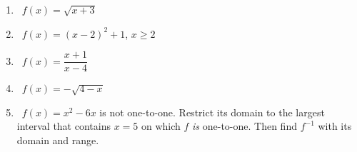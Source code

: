 \documentclass[11pt,letterpaper]{article}
\newif\ifkey
\newcommand{\badge}[2]{\tcbox[on line,colback=#1,colframe=#1,coltext=white,boxrule=0pt,arc=6pt,left=4pt,right=4pt,top=1pt,bottom=1pt,fontupper=\scriptsize\bfseries]{#2}}
\newcommand{\medium}{\badge{FangTeal}{MEDIUM}}
\newcommand{\hard}{\badge{FangRed}{HARD}}
\newcommand{\finv}{f^{-1}}
\newcommand{\work}[2][]{\ifkey\begin{sol}#2\end{sol}\else\vspace*{#1}\fi}
\newcommand{\np}[1][6cm]{\needspace{#1}}
\begin{document}
\begin{enumerate}[resume,leftmargin=*,label=\textbf{\arabic*.},itemsep=6pt]
\np\item \medium\ $f(x)=\sqrt{x+3}$
\work[3.2cm]{(a) Domain $[-3,\infty)$ (need $x+3\ge0$); range $[0,\infty)$. \\
(b) Swap: $x=\sqrt{y+3}$ \;$\to$\; $x^2=y+3$ \;$\to$\; $\finv(x)=x^2-3$, \; $x\ge0$. \\
(c) Domain of $\finv$ $=[0,\infty)$ (the range of $f$); range of $\finv$ $=[-3,\infty)$ (the domain of $f$). \\
Check: $f(1)=2$, \; $\finv(2)=4-3=1$ \checkmark}

\np\item \medium\ $f(x)=(x-2)^2+1$, \; $x\ge2$
\work[3.2cm]{(a) Domain $[2,\infty)$ (given); the vertex is $(2,1)$ and the graph goes up, so range $[1,\infty)$. \\
(b) Swap: $x=(y-2)^2+1$ \;$\to$\; $(y-2)^2=x-1$ \;$\to$\; $y-2=\sqrt{x-1}$ (take $+$, because $y\ge2$) \;$\to$\; $\finv(x)=2+\sqrt{x-1}$. \\
(c) Domain of $\finv$ $=[1,\infty)$; range $=[2,\infty)$. \quad Check: $f(4)=5$, \; $\finv(5)=2+2=4$ \checkmark}

\np\item \medium\ $f(x)=\dfrac{x+1}{x-4}$
\work[3.4cm]{(a) Domain $x\neq4$. Horizontal asymptote $y=1$ and $f(x)=1$ has no solution, so range $y\neq1$. \\
(b) Swap: $x=\dfrac{y+1}{y-4}$ \;$\to$\; $xy-4x=y+1$ \;$\to$\; $xy-y=4x+1$ \;$\to$\; $y(x-1)=4x+1$ \;$\to$\; $\finv(x)=\dfrac{4x+1}{x-1}$. \\
(c) Domain of $\finv$: $x\neq1$; range: $y\neq4$ — exactly the range and domain of $f$ swapped. \quad Check: $f(5)=6$, $\finv(6)=\frac{25}{5}=5$ \checkmark}

\np\item \hard\ $f(x)=-\sqrt{4-x}$
\work[3.4cm]{(a) Need $4-x\ge0$: domain $(-\infty,4]$. A square root is $\ge0$, so with the minus sign: range $(-\infty,0]$. \\
(b) Swap: $x=-\sqrt{4-y}$ \;$\to$\; square: $x^2=4-y$ \;$\to$\; $\finv(x)=4-x^2$, \; $x\le0$. \\
(c) Domain of $\finv$ $=(-\infty,0]$; range $=(-\infty,4]$. \quad Check: $f(0)=-2$, \; $\finv(-2)=4-4=0$ \checkmark \\
(Without ``$x\le0$'' the formula would be a whole parabola — wrong.)}

\np\item \hard\ $f(x)=x^2-6x$ is not one-to-one. Restrict its domain to the largest interval that contains $x=5$ on which $f$ \emph{is} one-to-one. Then find $\finv$ with its domain and range.
\work[3.8cm]{Complete the square: $f(x)=(x-3)^2-9$, vertex $(3,-9)$. Each side of $x=3$ is one-to-one; the side containing $5$ is $x\ge3$. \\
$f$: domain $[3,\infty)$, range $[-9,\infty)$. \\
Swap: $x=(y-3)^2-9$ \;$\to$\; $(y-3)^2=x+9$ \;$\to$\; $y=3+\sqrt{x+9}$ (take $+$ because $y\ge3$). \\
$\finv(x)=3+\sqrt{x+9}$: domain $[-9,\infty)$, range $[3,\infty)$. \quad Check: $f(5)=-5$, \; $\finv(-5)=3+2=5$ \checkmark}
\end{enumerate}
\end{document}
